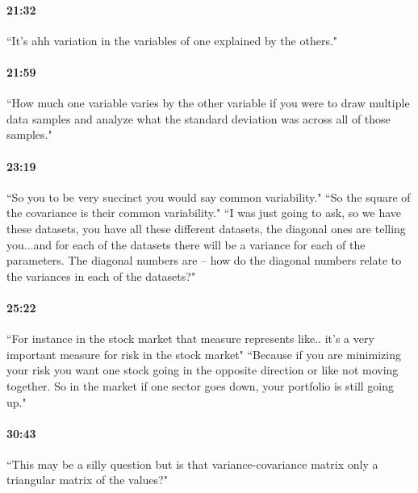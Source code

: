 \documentclass[11pt]{article}
\begin{document}
\paragraph{21:32}  ``It's ahh variation in the variables of one explained by the others."
\paragraph{21:59}``How much one variable varies by the other variable if you were to draw multiple data samples and analyze what the standard deviation was across all of those samples."
\paragraph{23:19}  ``So you to be very succinct you would say common variability." ``So the square of the covariance is their common variability."
``I was just going to ask, so we have these datasets, you have all these different datasets, the diagonal ones are telling you...and for each of the datasets there will be a variance for each of the parameters.  The diagonal numbers are -- how do the diagonal numbers relate to the variances in each of the datasets?"
\paragraph{25:22} ``For instance in the stock market that measure represents like.. it's a very important measure for risk in the stock market"  ``Because if you are minimizing your risk you want one stock going in the opposite direction or like not moving together.  So in the market if one sector goes down, your portfolio is still going up."
\paragraph{30:43} ``This may be a silly question but is that variance-covariance matrix only a triangular matrix of the values?"
\end{document}
